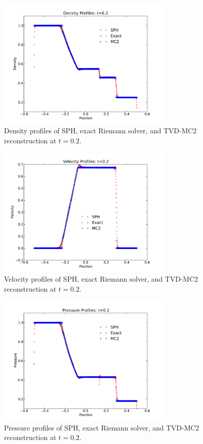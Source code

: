 \documentclass[11pt,letterpaper]{article}
\begin{document}
\begin{figure}[bth]
\centering
\includegraphics[width=0.75\textwidth]{density_with_ws15.pdf}
\caption{Density profiles of SPH, exact Riemann solver,
         and TVD-MC2 reconstruction at $t=0.2$.}
\label{fig:density}
\end{figure}

\begin{figure}[bth]
\centering
\includegraphics[width=0.75\textwidth]{velocity_with_ws15.pdf}
\caption{Velocity profiles of SPH, exact Riemann solver,
         and TVD-MC2 reconstruction at $t=0.2$.}
\label{fig:velocity}
\end{figure}

\begin{figure}[bth]
\centering
\includegraphics[width=0.75\textwidth]{pressure_with_ws15.pdf}
\caption{Pressure profiles of SPH, exact Riemann solver,
         and TVD-MC2 reconstruction at $t=0.2$.}
\label{fig:pressure}
\end{figure}
\end{document}
